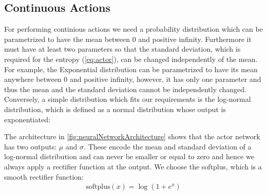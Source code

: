 \documentclass[conference]{IEEEtran}
\newcommand\note[2]{{\color{#1}#2}}
\begin{document}

\subsection{Continuous Actions}

For performing continious actions we need a probability distribution which can be parametrized to have the mean between 0 and positive infinity. Furthermore it must have at least two parameters so that the standard deviation, which is required for the entropy (\autoref{eq:actor}), can be changed independently of the mean. For example, the Exponential distribution can be parametrized to have its mean anywhere between 0 and positive infinity, however, it has only one parameter and thus the mean and the standard deviation cannot be independently changed. Conversely, a simple distribution which fits our requirements is the log-normal distribution, which is defined as a normal distribution whose output is exponentiated:


The architecture in \autoref{fig:neuralNetworkArchitecture} shows that the actor network has two outputs: $\mu$ and $\sigma$. These encode the mean and standard deviation of a log-normal distribution and can never be smaller or equal to zero and hence we always apply a rectifier function at the output. We choose the softplus, which is a smooth rectifier function:
\begin{align}
\text{softplus}(x) = \log\left(1 + e^x \right)
\end{align}
\end{document}
